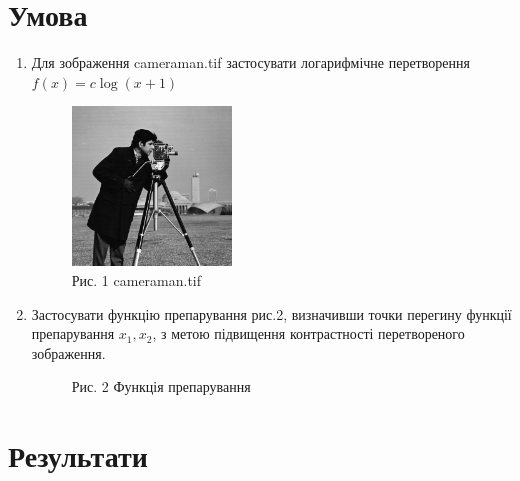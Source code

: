\section*{Умова}

\begin{enumerate}
    \item Для зображення cameraman.tif застосувати логарифмічне перетворення
    $ f(x) = c \log(x + 1) $

    \begin{figure}[h]
        \begin{center}
            \includegraphics[width=0.4\textwidth]{cameraman.png}
            \caption*{Рис. 1 cameraman.tif}
        \end{center}
    \end{figure}

    \item Застосувати функцію препарування рис.2, визначивши точки перегину функції 
    препарування $x_{1}, x_{2}$, з метою підвищення контрастності перетвореного зображення.

    \begin{figure}[h]
        \begin{center}
            \caption*{Рис. 2 Функція препарування }
        \end{center}
    \end{figure}

\end{enumerate}

\pagebreak

\section*{Результати}